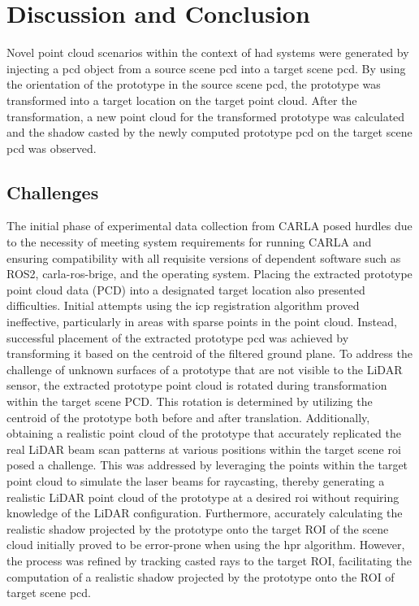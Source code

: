 \chapter{Discussion and Conclusion}
Novel point cloud scenarios within the context of \acrfull{had} systems were generated by injecting a \acrfull{pcd} object from a source scene \acrshort{pcd} into a target scene \acrshort{pcd}. By using the orientation of the prototype in the source scene \acrshort{pcd}, the prototype was transformed into a target location on the target point cloud. After the transformation, a new point cloud for the transformed prototype was calculated and the shadow casted by the newly computed prototype \acrshort{pcd} on the target scene \acrshort{pcd} was observed.

\section{Challenges}

The initial phase of experimental data collection from CARLA posed hurdles due to the necessity of meeting system requirements for running CARLA and ensuring compatibility with all requisite versions of dependent software such as ROS2, carla-ros-brige, and the operating system. Placing the extracted prototype point cloud data (PCD) into a designated target location also presented difficulties. Initial attempts using the \acrfull{icp} registration algorithm proved ineffective, particularly in areas with sparse points in the point cloud. Instead, successful placement of the extracted prototype \acrshort{pcd} was achieved by transforming it based on the centroid of the filtered ground plane. To address the challenge of unknown surfaces of a prototype that are not visible to the LiDAR sensor, the extracted prototype point cloud is rotated during transformation within the target scene PCD. This rotation is determined by utilizing the centroid of the prototype both before and after translation. Additionally, obtaining a realistic point cloud of the prototype that accurately replicated the real LiDAR beam scan patterns at various positions within the target scene \acrfull{roi} posed a challenge. This was addressed by leveraging the points within the target point cloud to simulate the laser beams for raycasting, thereby generating a realistic LiDAR point cloud of the prototype at a desired \acrshort{roi} without requiring knowledge of the LiDAR configuration. Furthermore, accurately calculating the realistic shadow projected by the prototype onto the target ROI of the scene cloud initially proved to be error-prone when using the \acrfull{hpr} algorithm. However, the process was refined by tracking casted rays to the target ROI, facilitating the computation of a realistic shadow projected by the prototype onto the ROI of target scene \acrshort{pcd}.



